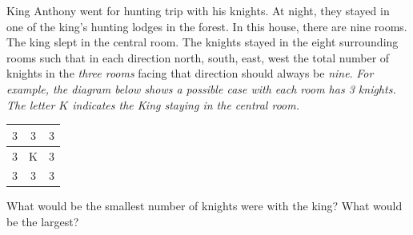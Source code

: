 \documentclass{article}
\begin{document}
\begin{example*}

    King Anthony went for hunting trip with his knights.
    At night, they stayed in one of the king's hunting lodges in the forest.
    In this house, there are nine rooms. The king slept in the central room.
    The knights stayed in the eight surrounding rooms such that
    in each direction north, south, east, west the total number of knights 
    in the \textit{three rooms} facing that direction should always be \textit{nine}.
    \textit{For example, the diagram below shows a possible case with each room has 3 knights.
    The letter $K$ indicates the King staying in the central room.}

    \begin{center}
        \begin{minipage}[t]{6.5cm}
            \centering
            \begin{tabular}{|c|c|c|}
                \hline
                $3$ & $3$    & $3$ \\ \hline
                $3$ & K & $3$ \\ \hline
                $3$ & $3$    & $3$ \\ \hline
            \end{tabular}
        \end{minipage}
    \end{center}

    What would be the smallest number of knights were with the king?
    What would be the largest?
\end{example*}
\end{document}
